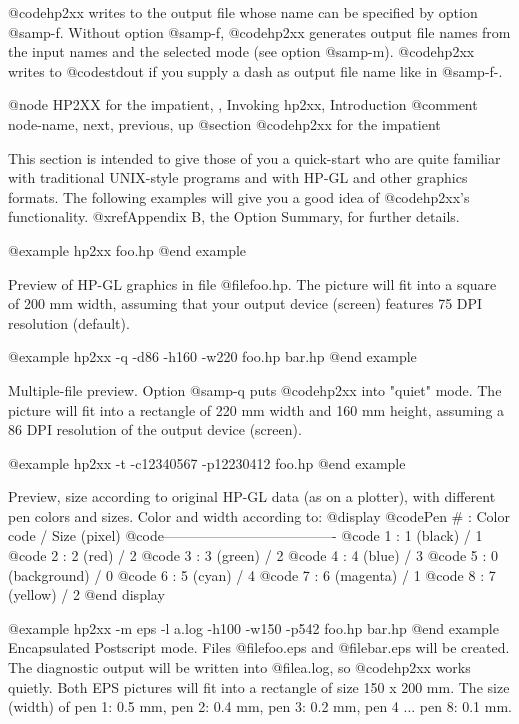 @code{hp2xx} writes to the output file whose name can be specified
by option @samp{-f}. Without option @samp{-f}, @code{hp2xx} generates
output file names from the input names and the selected mode
(see option @samp{-m}). @code{hp2xx} writes to @code{stdout} if you supply
a dash as output file name like in @samp{-f-}.



@node HP2XX for the impatient, , Invoking hp2xx, Introduction
@comment  node-name,  next,  previous,  up
@section @code{hp2xx} for the impatient

This section is intended to give those of you a quick-start who are
quite familiar with traditional UNIX-style programs and with HP-GL and
other graphics formats.
The following examples will give you a good idea of @code{hp2xx}'s
functionality. @xref{Appendix B}, the Option Summary, for further details.


@example
hp2xx foo.hp
@end example

Preview of HP-GL graphics in file @file{foo.hp}. The picture will
fit into a square of 200 mm width, assuming that your output device
(screen) features 75 DPI resolution (default).

@example
hp2xx -q -d86 -h160 -w220  foo.hp bar.hp
@end example

Multiple-file preview. Option @samp{-q} puts @code{hp2xx} into "quiet" mode.
The picture will fit into a rectangle of 220 mm width and 160 mm height,
assuming a 86 DPI resolution of the output device (screen).

@example
hp2xx -t -c12340567 -p12230412 foo.hp
@end example

Preview, size according to original HP-GL data (as on a plotter),
with different pen colors and sizes. Color and width according to:
@display
  @code{Pen # : Color code     / Size (pixel)}
  @code{-------------------------------------}
  @code{  1   : 1 (black)      /    1}
  @code{  2   : 2 (red)        /    2}
  @code{  3   : 3 (green)      /    2}
  @code{  4   : 4 (blue)       /    3}
  @code{  5   : 0 (background) /    0}
  @code{  6   : 5 (cyan)       /    4}
  @code{  7   : 6 (magenta)    /    1}
  @code{  8   : 7 (yellow)     /    2}
@end display

@example
hp2xx -m eps -l a.log -h100 -w150 -p542  foo.hp bar.hp
@end example
Encapsulated Postscript mode. Files @file{foo.eps} and @file{bar.eps}
will be created. The diagnostic output will be written into @file{a.log},
so @code{hp2xx} works quietly. Both EPS pictures will fit into a
rectangle of size 150 x 200 mm. The size (width) of
pen 1: 0.5 mm, pen 2: 0.4 mm, pen 3: 0.2 mm, pen 4 ... pen 8: 0.1 mm.

